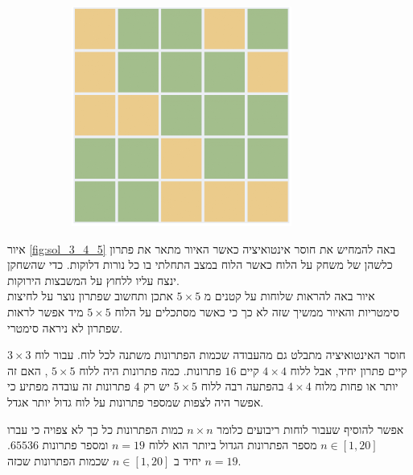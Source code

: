 \documentclass[12pt,twoside]{article}
\begin{document}
\begin{figure}[ht]
\begin{subfigure}[b]{.25\linewidth}
    \end{subfigure}
    \begin{subfigure}[b]{.25\linewidth}
    \includegraphics[width=\linewidth]{images/5x5_sol.PNG}
    \end{subfigure}

\end{figure}
\sethebrew

איור
\ref{fig:sol_3_4_5}
באה להמחיש את חוסר  אינטואיציה
כאשר האיור מתאר את פתרון כלשהן של משחק על הלוח כאשר הלוח במצב התחלתי בו כל נורות דלוקות.
כדי שהשחקן ינצח עליו ללחוץ על המשבצות הירוקות.
\\
איור באה להראות שלוחות על קטנים מ
$5 \times 5$
אתכן ותחשוב שפתרון נוצר על לחיצות סימטריות והאיור ממשיך שזה לא כך 
כי כאשר מסתכלים על הלוח 
$5 \times 5$
מיד אפשר לראות שפתרון לא ניראה סימטרי.

חוסר האינטואיציה מתבלט גם מהעבודה שכמות הפתרונות משתנה לכל לוח.
עבור לוח 
$3 \times 3$
קיים פתרון יחיד,
אבל ללוח 
$4 \times 4$
קיים
$16$
פתרונות.
כמה פתרונות היה ללוח
$5 \times 5$
,
האם זה יותר או פחות מלוח
$4 \times 4$
בהפתעה רבה ללוח 
$5 \times 5$
יש רק 
$4$
פתרונות זה עובדה מפתיע כי אפשר היה לצפות שמספר פתרונות על לוח גדול יותר אגדל.

אפשר להוסיף שעבור לוחות ריבועים כלומר
$n \times n$
כמות הפתרונות כל כך לא צפויה כי עברו 
$n \in [1,20]$
מספר הפתרונות הגדול ביותר הוא ללוח
$n = 19$ 
ומספר פתרונות 
$65536$.
$n = 19$ 
 יחיד ב
$n \in [1,20]$
שכמות הפתרונות שכזה.
\end{document}

